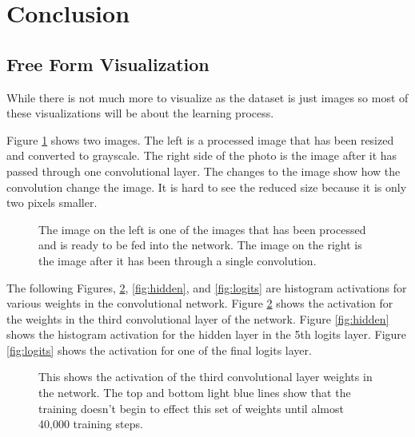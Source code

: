 \documentclass[12pt,twocolumn,letterpaper]{article}
\begin{document}
\section{Conclusion}
\subsection{Free Form Visualization}
While there is not much more to visualize as the dataset is just images so most 
of these visualizations will be about the learning process.

Figure \ref{fig:two image} shows two images. The left is a processed image that has been resized 
and converted to grayscale. The right side of the photo is the image after it 
has passed through one convolutional layer. The changes to the image show how the 
convolution change the image. It is hard to see the reduced size because it is 
only two pixels smaller.

\begin{figure}[t]
\begin{center}
\end{center}
   \caption{The image on the left is one of the images that has been processed 
   and is ready to be fed into the network. The image on the right is the image
   after it has been through a single convolution.}
\label{fig:two image}
\end{figure}

The following Figures, \ref{fig:conv}, \ref{fig:hidden}, and \ref{fig:logits}
are histogram activations for various 
weights in the convolutional network. Figure \ref{fig:conv} shows the activation for the 
weights in the third convolutional layer of the network. Figure \ref{fig:hidden} shows the 
histogram activation for the hidden layer in the 5th logits layer. Figure \ref{fig:logits} 
shows the activation for one of the final logits layer. 

\begin{figure}[t]
\begin{center}
\end{center}
   \caption{This shows the activation of the third convolutional layer weights in 
   the network. The top and bottom light blue lines show that the training doesn't 
   begin to effect this set of weights until almost 40,000 training steps.}
\label{fig:conv}
\end{figure}
\end{document}
